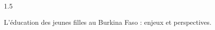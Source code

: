 \documentclass[12pt]{article}
\begin{document}
\begin{spacing}{1.5}

L'éducation des jeunes filles au Burkina Faso : enjeux et perspectives.


\quad
\quad

\end{spacing}
\end{document}
